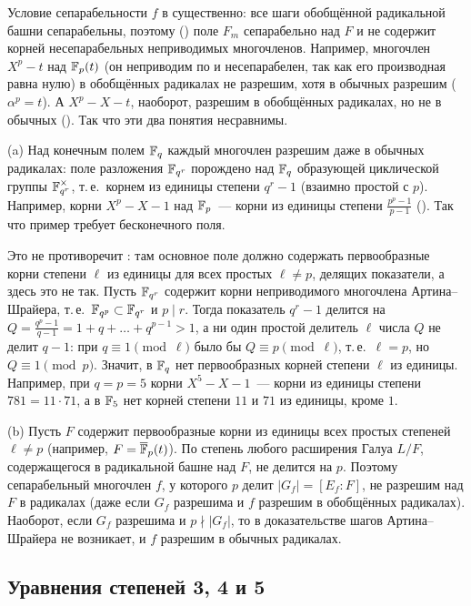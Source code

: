 Условие сепарабельности $f$ в  существенно: все шаги обобщённой радикальной башни сепарабельны, поэтому ()
поле $F_m$ сепарабельно над $F$ и не содержит корней несепарабельных неприводимых многочленов. Например, многочлен
$X^p-t$ над $\mathbb F_p(t)$ (он неприводим по  и несепарабелен, так как его производная равна нулю) в обобщённых радикалах
не разрешим, хотя в обычных разрешим ($\alpha^p=t$). А $X^p-X-t$, наоборот, разрешим в обобщённых радикалах, но не в
обычных (). Так что эти два понятия несравнимы.

\begin{remark}[5.35c]
(a) Над конечным полем $\mathbb F_q$ каждый многочлен разрешим даже в обычных радикалах: поле разложения $\mathbb F_{q^r}$ порождено над
$\mathbb F_q$ образующей циклической группы $\mathbb F_{q^r}^\times$, т.\,е.\ корнем из единицы степени $q^r-1$ (взаимно простой с $p$).
Например, корни $X^p-X-1$ над $\mathbb F_p$~--- корни из единицы степени $\frac{p^p-1}{p-1}$ (). Так что пример 
требует бесконечного поля.

Это не противоречит : там основное поле должно содержать первообразные корни степени $\ell$ из единицы для всех
простых $\ell\ne p$, делящих показатели, а здесь это не так. Пусть $\mathbb F_{q^r}$ содержит корни неприводимого многочлена
Артина--Шрайера, т.\,е.\ $\mathbb F_{q^p}\subset\mathbb F_{q^r}$ и $p\mid r$. Тогда показатель $q^r-1$ делится на
$Q=\frac{q^p-1}{q-1}=1+q+\dots+q^{p-1}>1$, а ни один простой делитель $\ell$ числа $Q$ не делит $q-1$: при
$q\equiv1\pmod\ell$ было бы $Q\equiv p\pmod\ell$, т.\,е.\ $\ell=p$, но $Q\equiv1\pmod p$. Значит, в $\mathbb F_q$ нет
первообразных корней степени $\ell$ из единицы. Например, при $q=p=5$ корни $X^5-X-1$~--- корни из единицы степени
$781=11\cdot71$, а в $\mathbb F_5$ нет корней степени $11$ и $71$ из единицы, кроме $1$.

(b) Пусть $F$ содержит первообразные корни из единицы всех простых степеней $\ell\ne p$ (например, $F=\overline{\mathbb F}_p(t)$). По 
степень любого расширения Галуа $L/F$, содержащегося в радикальной башне над $F$, не делится на $p$. Поэтому
сепарабельный многочлен $f$, у которого $p$ делит $|G_f|=[E_f:F]$, не разрешим над $F$ в радикалах (даже если $G_f$
разрешима и $f$ разрешим в обобщённых радикалах). Наоборот, если $G_f$ разрешима и $p\nmid|G_f|$, то в доказательстве  шагов Артина--Шрайера не возникает, и
$f$ разрешим в обычных радикалах.
\end{remark}

\subsection*{Уравнения степеней 3, 4 и 5}

